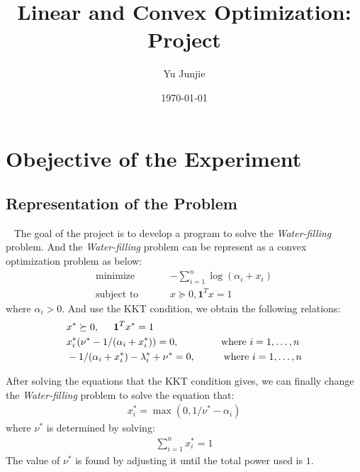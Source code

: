 \documentclass[a4paper,12pt]{article}
\begin{document}
    \title{Linear and Convex Optimization: Project}
    \author{Yu Junjie}
    \date{\today}
    \maketitle

    {\large\tableofcontents}
    \newpage

    \section{Obejective of the Experiment}
    \subsection{Representation of the Problem}
    \
    \newline
    \indent The goal of the project is to develop a program to solve the \textit{Water-filling} problem. And the \textit{Water-filling} problem can be represent as a convex optimization problem as below:
    \begin{align}
        \text{minimize} \hspace{1cm} &-\sum_{i = 1}^{n} \log (\alpha_i + x_i) \\
        \text{subject to}  \hspace{1cm} &x\succeq 0, \textbf{1}^T x = 1
    \end{align}
    where $\alpha_i > 0$. And use the KKT condition, we obtain the following relations:
    \begin{align}
        &x^* \succeq 0, \hspace{0.5cm}\textbf{1}^T x^* = 1 \\
        &x_i^*(\nu^* - 1/(\alpha_i + x_i^*)) = 0, \hspace{1.5cm}\text{where $i = 1,\dots,n$} \\
        &-1/(\alpha_i + x_i^*) - \lambda_i^*+\nu^* = 0, \hspace{1cm}\text{where $i = 1,\dots,n$}
    \end{align}
    
    After solving the equations that the KKT condition gives, we can finally change the \textit{Water-filling} problem to solve the equation that:
    \begin{align}
        x_i^* = \max(0, 1/\nu^* - \alpha_i)
    \end{align} 
    where $\nu^*$ is determined by solving: 
    \begin{align}
        \sum_{i = 1}^{n} x_i^* = 1 
    \end{align}
    The value of $\nu^*$ is found by adjusting it until the total power used is $1$.
    
\end{document}
